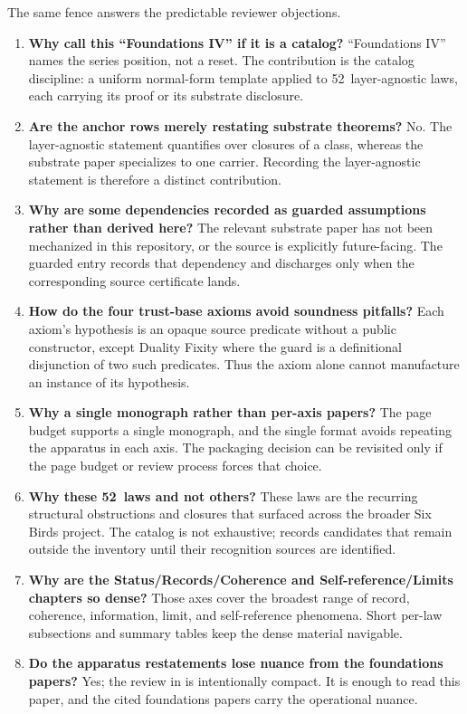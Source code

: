 \documentclass[11pt]{article}
\newcommand{\NumLaws}{52}
\theoremstyle{definition}
\begin{document}
The same fence answers the predictable reviewer objections.

\begin{enumerate}[label=\textbf{O\arabic*.}, leftmargin=*]
\item \textbf{Why call this ``Foundations IV'' if it is a catalog?}
``Foundations IV'' names the series position, not a reset. The
contribution is the catalog discipline: a uniform normal-form
template applied to \NumLaws\ layer-agnostic laws, each carrying
its proof or its substrate disclosure.

\item \textbf{Are the anchor rows merely restating substrate theorems?}
No. The layer-agnostic statement quantifies over closures of a class,
whereas the substrate paper specializes to one carrier. Recording the
layer-agnostic statement is therefore a distinct contribution.

\item \textbf{Why are some dependencies recorded as guarded assumptions
rather than derived here?}
The relevant substrate paper has not been mechanized in this repository,
or the source is explicitly future-facing. The guarded entry records
that dependency and discharges only when the corresponding source
certificate lands.

\item \textbf{How do the four trust-base axioms avoid soundness
pitfalls?}
Each axiom's hypothesis is an opaque source predicate without a public
constructor, except Duality Fixity where the guard is a definitional
disjunction of two such predicates. Thus the axiom alone cannot
manufacture an instance of its hypothesis.

\item \textbf{Why a single monograph rather than per-axis papers?}
The page budget supports a single monograph, and the single format
avoids repeating the apparatus in each axis. The packaging decision can
be revisited only if the page budget or review process forces that
choice.

\item \textbf{Why these \NumLaws\ laws and not others?}
These laws are the recurring structural obstructions and closures that
surfaced across the broader Six Birds project. The catalog is not
exhaustive;  records candidates that remain outside
the inventory until their recognition sources are identified.

\item \textbf{Why are the Status/Records/Coherence and
Self-reference/Limits chapters so dense?}
Those axes cover the broadest range of record, coherence, information,
limit, and self-reference phenomena. Short per-law subsections and
summary tables keep the dense material navigable.

\item \textbf{Do the apparatus restatements lose nuance from the
foundations papers?}
Yes; the review in  is intentionally compact.
It is enough to read this paper, and the cited foundations papers
carry the operational nuance.
\end{enumerate}
\end{document}
